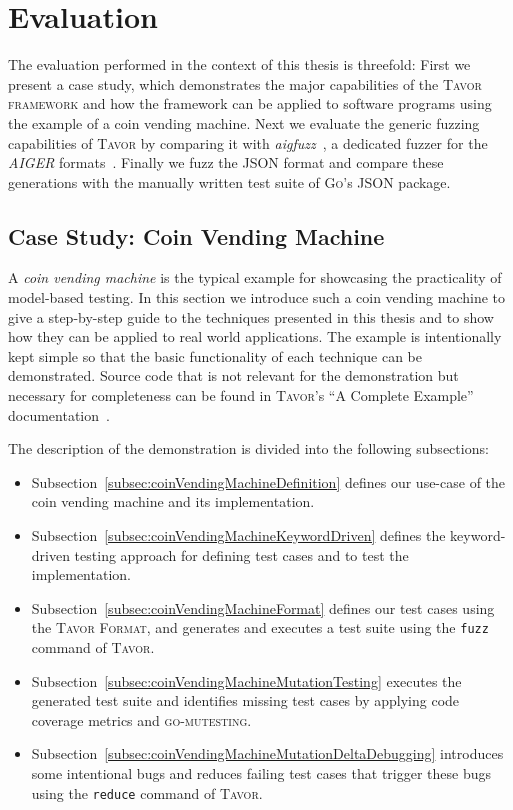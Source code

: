 \chapter{Evaluation}
\label{chapter:evaluation}

The evaluation performed in the context of this thesis is threefold: First we present a case study, which demonstrates the major capabilities of the \textsc{Tavor framework} and how the framework can be applied to software programs using the example of a coin vending machine. Next we evaluate the generic fuzzing capabilities of \textsc{Tavor} by comparing it with \emph{aigfuzz}~\cite{2017_aig_fuzz}, a dedicated fuzzer for the \emph{AIGER} formats~\cite{biere2007aiger}. Finally we fuzz the JSON format and compare these generations with the manually written test suite of \textsc{Go}'s JSON package.

\section{Case Study: Coin Vending Machine}
\label{sec:evaluationCoinVendingMachine}

A \emph{coin vending machine} is the typical example for showcasing the practicality of model-based testing. In this section we introduce such a coin vending machine to give a step-by-step guide to the techniques presented in this thesis and to show how they can be applied to real world applications. The example is intentionally kept simple so that the basic functionality of each technique can be demonstrated. Source code that is not relevant for the demonstration but necessary for completeness can be found in \textsc{Tavor}'s \enquote{A Complete Example} documentation~\cite{2017_tavor-complete-example}.

The description of the demonstration is divided into the following subsections:

\begin{itemize}
\item Subsection~\ref{subsec:coinVendingMachineDefinition} defines our use-case of the coin vending machine and its implementation.
\item Subsection~\ref{subsec:coinVendingMachineKeywordDriven} defines the keyword-driven testing approach for defining test cases and to test the implementation.
\item Subsection~\ref{subsec:coinVendingMachineFormat} defines our test cases using the \textsc{Tavor Format}, and generates and executes a test suite using the \texttt{fuzz} command of \textsc{Tavor}.
\item Subsection~\ref{subsec:coinVendingMachineMutationTesting} executes the generated test suite and identifies missing test cases by applying code coverage metrics and \textsc{go-mutesting}.
\item Subsection~\ref{subsec:coinVendingMachineMutationDeltaDebugging} introduces some intentional bugs and reduces failing test cases that trigger these bugs using the \texttt{reduce} command of \textsc{Tavor}.
\end{itemize}

